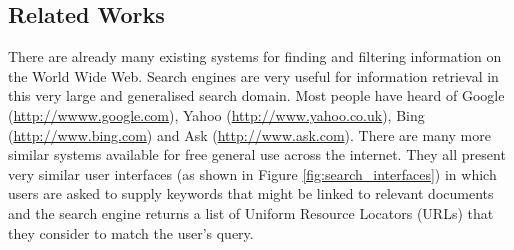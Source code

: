 \documentclass[12pt,a4paper]{article}
\begin{document}
\subsection{Related Works}
\label{sec:prior_art}

There are already many existing systems for finding and filtering information
on the World Wide Web. Search engines are very useful for information retrieval
in this very large and generalised search domain. Most people have heard of
Google (\url{http://wwww.google.com}), Yahoo (\url{http://www.yahoo.co.uk}),
Bing (\url{http://www.bing.com}) and Ask (\url{http://www.ask.com}). There are
many more similar systems available for free general use across the internet.
They all present very similar user interfaces (as shown in Figure
\ref{fig:search_interfaces}) in which users are asked to supply keywords that
might be linked to relevant documents and the search engine returns a list of
Uniform Resource Locators (URLs) that they consider to match the user's query.
\end{document}
